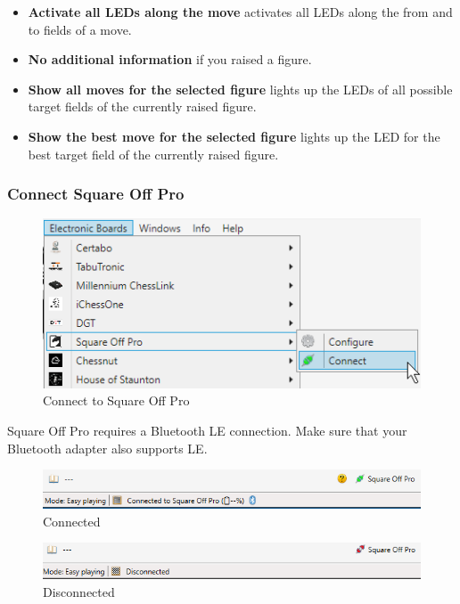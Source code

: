\documentclass[11pt,a4paper]{article}
\begin{document}
\begin{itemize}
	\item \textbf{Activate all LEDs along the move} activates all LEDs along the from and to fields of a move.
	\item \textbf{No additional information} if you raised a figure.
	\item \textbf{Show all moves for the selected figure} lights up the LEDs of all possible target fields of the currently raised figure.
	\item \textbf{Show the best move for the selected figure} lights up the LED for the best target field of the currently raised figure.
\end{itemize}

\subsubsection{Connect Square Off Pro} \label{ConnnectSquareOff}
\begin{figure}[H]
	\centering
	\includegraphics[scale=1.0]{SquareOffPro1.png}
	\caption{Connect to Square Off Pro }
	\label{fig:SquareOffPro1}
\end{figure}


Square Off Pro requires a Bluetooth LE connection. Make sure that your Bluetooth adapter also supports LE.

\begin{figure}[H]
	\centering
	\includegraphics[scale=0.8]{SquareOffPro2.png}
	\caption{Connected}
	\label{fig:SquareOffPro2}
\end{figure}

\begin{figure}[H]
	\centering
	\includegraphics[scale=0.8]{SquareOffPro3.png}
	\caption{Disconnected}
	\label{fig:SquareOffPro3}
\end{figure}
\end{document}
